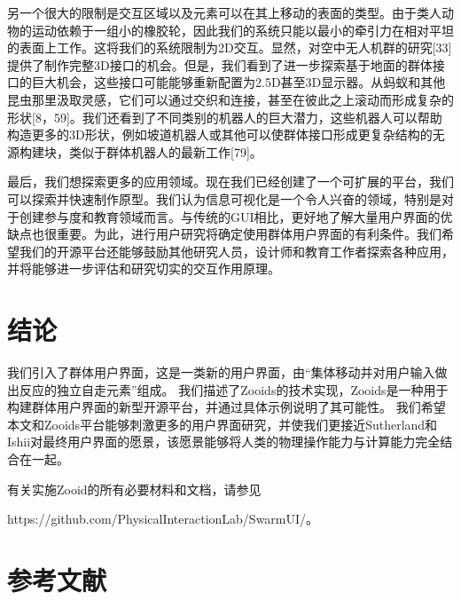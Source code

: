 另一个很大的限制是交互区域以及元素可以在其上移动的表面的类型。由于类人动物的运动依赖于一组小的橡胶轮，因此我们的系统只能以最小的牵引力在相对平坦的表面上工作。这将我们的系统限制为2D交互。显然，对空中无人机群的研究[33]提供了制作完整3D接口的机会。但是，我们看到了进一步探索基于地面的群体接口的巨大机会，这些接口可能能够重新配置为2.5D甚至3D显示器。从蚂蚁和其他昆虫那里汲取灵感，它们可以通过交织和连接，甚至在彼此之上滚动而形成复杂的形状[8，59]。我们还看到了不同类别的机器人的巨大潜力，这些机器人可以帮助构造更多的3D形状，例如坡道机器人或其他可以使群体接口形成更复杂结构的无源构建块，类似于群体机器人的最新工作[79]。

最后，我们想探索更多的应用领域。现在我们已经创建了一个可扩展的平台，我们可以探索并快速制作原型。我们认为信息可视化是一个令人兴奋的领域，特别是对于创建参与度和教育领域而言。与传统的GUI相比，更好地了解大量用户界面的优缺点也很重要。为此，进行用户研究将确定使用群体用户界面的有利条件。我们希望我们的开源平台还能够鼓励其他研究人员，设计师和教育工作者探索各种应用，并将能够进一步评估和研究切实的交互作用原理。

\section{结论}

我们引入了群体用户界面，这是一类新的用户界面，由“集体移动并对用户输入做出反应的独立自走元素”组成。 我们描述了Zooids的技术实现，Zooids是一种用于构建群体用户界面的新型开源平台，并通过具体示例说明了其可能性。 我们希望本文和Zooids平台能够刺激更多的用户界面研究，并使我们更接近Sutherland和Ishii对最终用户界面的愿景，该愿景能够将人类的物理操作能力与计算能力完全结合在一起。

有关实施Zooid的所有必要材料和文档，请参见

https://github.com/PhysicalInteractionLab/SwarmUI/。

\section{参考文献}

